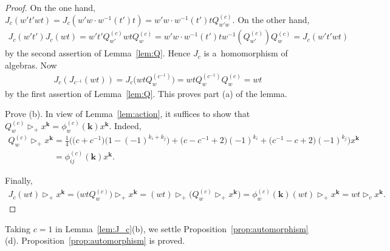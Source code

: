 \documentclass[pdftex]{sigma}
\begin{document}
\begin{proof}
On the one hand, $J_c(w't'w t)=J_c(w'w\cdot w^{-1}(t')t)=w'w \cdot w^{-1}(t')tQ_{w'w}^{(c)}$.
On the other hand,
\begin{gather*}
J_c(w't')J_c(w t) = w't'Q_{w'}^{(c)} wt Q^{(c)}_w=w'w \cdot w^{-1}(t')tw^{-1}(Q_{w'}^{(c)}) Q_w^{(c)}=J_c(w't'wt)
\end{gather*}
by the second assertion of Lemma~\ref{lem:Q}.
Hence $J_c$ is a~homomorphism of algebras.
Now{\samepage
\begin{gather*}
J_c(J_{c^{-1}}(wt))=J_c\big(wtQ_w^{(c^{-1})}\big)=wtQ_w^{(c^{-1})}Q_w^{(c)}=wt
\end{gather*}
by the f\/irst assertion of Lemma~\ref{lem:Q}.
This proves part (a) of the lemma.}

Prove (b).
In view of Lemma~\ref{lem:action}, it suf\/f\/ices to show that $Q_w^{(c)}\mathop{\triangleright}\nolimits_+ x^{\mathbf
k}=\phi_w^{(c)}(\mathbf k) x^{\mathbf k}$.
Indeed,
\begin{gather*}
Q_w^{(c)}\mathop{\triangleright}\nolimits_+ x^{\mathbf k}
= \frac14 \big(\big(c+c^{-1}\big)\big(1-(-1)^{k_i+k_j}\big)+\big(c-c^{-1}+2\big)(-1)^{k_i}+\big(c^{-1}-c+2\big)(-1)^{k_j}\big)x^{\mathbf k}
\\
\phantom{Q_w^{(c)}\mathop{\triangleright}\nolimits_+ x^{\mathbf k}}
=\phi_{ij}^{(c)}(\mathbf k)x^{\mathbf k}.
\end{gather*}

Finally,
\begin{gather*}
 J_c(wt)\mathop{\triangleright}\nolimits_+ x^{\mathbf k}
=\big(wtQ_w^{(c)}\big)\mathop{\triangleright}\nolimits_+x^{\mathbf k}
=(wt)\mathop{\triangleright}\nolimits_+\big(Q_w^{(c)}\mathop{\triangleright}\nolimits_+x^{\mathbf k}\big)
=\phi_w^{(c)}(\mathbf k)(wt)\mathop{\triangleright}\nolimits_+x^{\mathbf k} =wt\mathop{\triangleright}\nolimits_c x^{\mathbf k}. \!\!\!\tag*{\qed}
\end{gather*}
\renewcommand{\qed}{}
\end{proof}

Taking $c=1$ in Lemma~\ref{lem:J_c}(b), we settle Proposition~\ref{prop:automorphism}(d).
Proposition~\ref{prop:automorphism} is proved.
\end{document}
